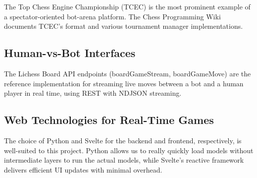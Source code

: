 The Top Chess Engine Championship (TCEC) \cite{tcec} is the most prominent example of a spectator-oriented bot-arena platform. The Chess Programming Wiki documents TCEC's format and various tournament manager implementations.


\subsection{Human-vs-Bot Interfaces}

The Lichess Board API \cite{lichess_api} endpoints (boardGameStream, boardGameMove) are the reference implementation for streaming live moves between a bot and a human player in real time, using REST with NDJSON streaming.


\subsection{Web Technologies for Real-Time Games}


The choice of Python and Svelte \cite{svelte} for the backend and frontend, respectively, is well-suited to this project. Python allows us to really quickly load models without intermediate layers to run the actual models, while Svelte's reactive framework delivers efficient UI updates with minimal overhead.


